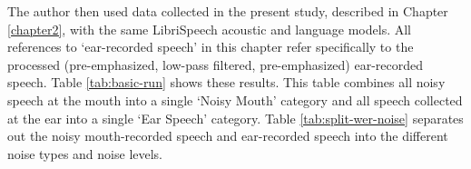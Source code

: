 The author then used data collected in the present study, described in Chapter \ref{chapter2}, with the same LibriSpeech acoustic and language models.  All references to `ear-recorded speech' in this chapter refer specifically to the processed (pre-emphasized, low-pass filtered, pre-emphasized) ear-recorded speech.  Table \ref{tab:basic-run} shows these results.  This table combines all noisy speech at the mouth into a single `Noisy Mouth' category and all speech collected at the ear into a single `Ear Speech' category.  Table \ref{tab:split-wer-noise} separates out the noisy mouth-recorded speech and ear-recorded speech into the different noise types and noise levels.



% 



